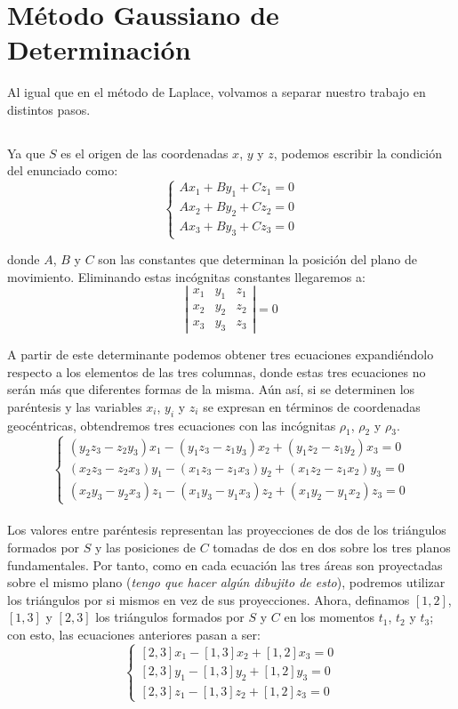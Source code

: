 \documentclass[11pt]{article}
\begin{document}
\section{Método Gaussiano de Determinación}
Al igual que en el método de Laplace, volvamos a separar nuestro trabajo en distintos pasos.\\

\subsection{}
Ya que $S$ es el origen de las coordenadas $x$, $y$ y $z$, podemos escribir la condición del enunciado como:
\[
\left\{
\begin{array}{l}
	Ax_1+By_1+Cz_1=0\\
	Ax_2+By_2+Cz_2=0\\
	Ax_3+By_3+Cz_3=0
\end{array}
\right.
\]

\noindent donde $A$, $B$ y $C$ son las constantes que determinan la posición del plano de movimiento. Eliminando estas incógnitas constantes llegaremos a:
\[
\left|
\begin{array}{ccc}
	x_1 & y_1 & z_1\\
	x_2 & y_2 & z_2\\
	x_3 & y_3 & z_3
\end{array}
\right|
=0
\]

A partir de este determinante podemos obtener tres ecuaciones expandiéndolo respecto a los elementos de las tres columnas, donde estas tres ecuaciones no serán más que diferentes formas de la misma. Aún así, si se determinen los paréntesis y las variables $x_i$, $y_i$ y $z_i$ se expresan en términos de coordenadas geocéntricas, obtendremos tres ecuaciones con las incógnitas $\rho_1$, $\rho_2$ y $\rho_3$.
\[
\left\{
\begin{array}{l}
	(y_2z_3-z_2y_3)x_1-(y_1z_3-z_1y_3)x_2+(y_1z_2-z_1y_2)x_3=0\\
	(x_2z_3-z_2x_3)y_1-(x_1z_3-z_1x_3)y_2+(x_1z_2-z_1x_2)y_3=0\\
	(x_2y_3-y_2x_3)z_1-(x_1y_3-y_1x_3)z_2+(x_1y_2-y_1x_2)z_3=0
\end{array}
\right.
\]\\

Los valores entre paréntesis representan las proyecciones de dos de los triángulos formados por $S$ y las posiciones de $C$ tomadas de dos en dos sobre los tres planos fundamentales. Por tanto, como en cada ecuación las tres áreas son proyectadas sobre el mismo plano (\textit{tengo que hacer algún dibujito de esto}), podremos utilizar los triángulos por si mismos en vez de sus proyecciones. Ahora, definamos $[1,2]$, $[1,3]$ y $[2,3]$ los triángulos formados por $S$ y $C$ en los momentos $t_1$, $t_2$ y $t_3$; con esto, las ecuaciones anteriores pasan a ser:
\[
\left\{
\begin{array}{l}
	[2,3]x_1-[1,3]x_2+[1,2]x_3=0\\
	{[2,3]}y_1-[1,3]y_2+[1,2]y_3=0\\
	{[2,3]}z_1-[1,3]z_2+[1,2]z_3=0
\end{array}
\right.
\]\\
\end{document}
